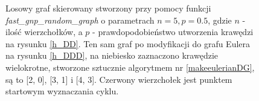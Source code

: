 \documentclass[a4paper, 12pt, twoside, openright]{article}
\begin{document}
	\captionsetup{justification=centering}	
	\begin{figure}[!p]
		\centering
				\quad
		
		\caption[]{Losowy graf skierowany stworzony przy pomocy funkcji \textit{fast\_gnp\_random\_graph} o parametrach $n=5, p=0.5$, gdzie $n$ - ilość wierzchołków, a $p$ - prawdopodobieństwo utworzenia krawędzi na rysunku \ref{h_DD}. Ten sam graf po modyfikacji do grafu Eulera na rysunku \ref{h_DDD}, na niebiesko zaznaczono krawędzie wielokrotne, stworzone sztucznie algorytmem nr \ref{makeeulerianDG}, są to [2, 0], [3, 1] i [4, 3]. Czerwony wierzchołek jest punktem startowym wyznaczania cyklu.}
		\label{h_Dgraph}
	\end{figure}	
\end{document}
